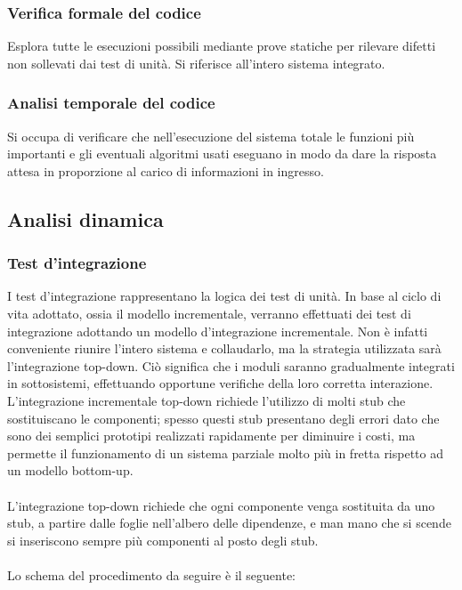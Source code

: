 \subsubsection{Verifica formale del codice}

Esplora tutte le esecuzioni possibili mediante prove statiche per rilevare
difetti non sollevati dai test di unit\`a. Si riferisce all'intero sistema integrato.

\subsubsection{Analisi temporale del codice}

Si occupa di verificare che nell'esecuzione del sistema totale le funzioni pi\`u
importanti e gli eventuali algoritmi usati eseguano in modo da dare la risposta
attesa in proporzione al carico di informazioni in ingresso.

\subsection{Analisi dinamica}
\subsubsection{Test d'integrazione}
I test d'integrazione rappresentano la logica dei test di unit\`a.
In base al ciclo di vita adottato, ossia il modello incrementale, verranno effettuati dei 
test di integrazione adottando un modello d'integrazione incrementale. 
Non \`e infatti conveniente riunire l'intero sistema e collaudarlo, ma la
strategia utilizzata sar\`a l'integrazione top-down. Ci\`o significa che i
moduli saranno gradualmente integrati in sottosistemi, effettuando opportune verifiche della loro  corretta interazione. 
L'integrazione incrementale top-down richiede l'utilizzo di molti stub che
sostituiscano le componenti; spesso questi stub presentano degli errori dato che sono dei semplici 
prototipi realizzati rapidamente per diminuire i costi, ma permette il funzionamento di 
un sistema parziale molto pi\`u in fretta rispetto ad un modello bottom-up.\\
\\
L'integrazione top-down richiede che ogni componente venga sostituita da uno
stub, a partire dalle foglie nell'albero delle dipendenze, e man mano che si scende si 
inseriscono sempre pi\`u componenti al posto degli stub. \\ \\
Lo schema del procedimento da seguire \`e il seguente:

